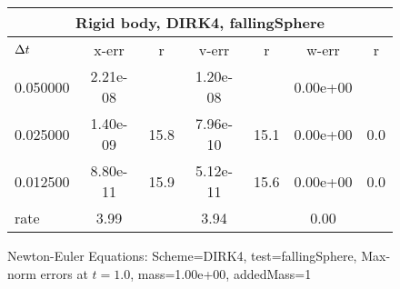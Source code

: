 \begin{figure}[hbt]\tableFont %
\begin{center}
\begin{tabular}{|l|c|c|c|c|c|c|} \hline 
\multicolumn{7}{|c|}{Rigid body, DIRK4, fallingSphere}     \\ \hline
${\Delta t}$    &  x-err   &   r   &  v-err   &   r   &  w-err   &   r   \\ \hline
0.050000 & 2.21e-08 &       & 1.20e-08 &       & 0.00e+00 &         \\ \hline
0.025000 & 1.40e-09 & 15.8  & 7.96e-10 & 15.1  & 0.00e+00 &  0.0    \\ \hline
0.012500 & 8.80e-11 & 15.9  & 5.12e-11 & 15.6  & 0.00e+00 &  0.0    \\ \hline
 rate    &  3.99   &       &  3.94   &       &  0.00   &          \\ \hline
\end{tabular}
\caption{Newton-Euler Equations: Scheme=DIRK4, test=fallingSphere, Max-norm errors at $t= 1.0$, mass=1.00e+00, addedMass=1 }
\label{tab:TestfallingSphere_SchemeDIRK4}
\end{center}
\end{figure} 
